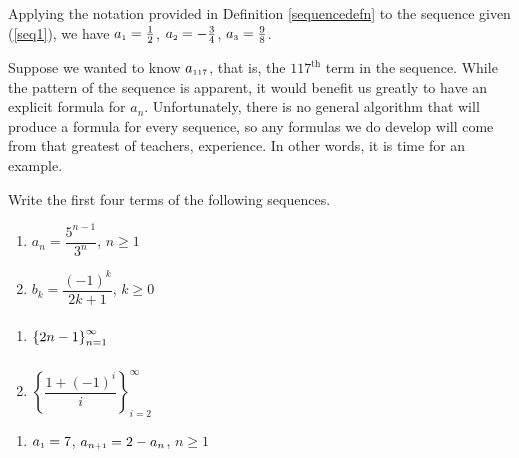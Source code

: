 \smallskip

Applying the notation provided in Definition \ref{sequencedefn} to the sequence given (\ref{seq1}), we have $a_{\text{\tiny$1$}} =  \frac{1}{2}$, $a_{\text{\tiny$2$}} =  -\frac{3}{4}$, $a_{\text{\tiny$3$}} =  \frac{9}{8}$. 

Suppose we wanted to know $a_{\text{\tiny$117$}}$, that is, the $117^{\text{th}}$ term in the sequence. While the pattern of the sequence is apparent, it would benefit us greatly to have an explicit formula for $a_{n}$.  Unfortunately, there is no general algorithm that will produce a formula for every sequence, so any formulas we do  develop will come from that greatest of teachers, experience. In other words, it is time for an example.

\begin{ex} \label{seqex1}  Write the first four terms of the following sequences.

\begin{multicols}{2}
\begin{enumerate}


\item  $a_{n} = \dfrac{5^{n-1}}{3^{n}}$, $n \geq 1$

\item  $b_{k} = \dfrac{(-1)^{k}}{2k+1}$, $k \geq 0$

\setcounter{HW}{\value{enumi}}
\end{enumerate}
\end{multicols}

\begin{multicols}{2}
\begin{enumerate}
\setcounter{enumi}{\value{HW}}

\item  $\left\{ 2n - 1 \right\}_{n=1}^{\infty} \vphantom{\left\{\dfrac{1 + (-1)^{i}}{i} \right\}_{i=2}^{\infty}}$

\item  $\left\{\dfrac{1 + (-1)^{i}}{i} \right\}_{i=2}^{\infty}$

\setcounter{HW}{\value{enumi}}
\end{enumerate}
\end{multicols}

\begin{multicols}{2}
\begin{enumerate}
\setcounter{enumi}{\value{HW}}


\item\label{introrecursiveex01}  $a_{\text{\tiny$1$}} = 7$, $a_{n \text{\tiny$ + 1$}} = 2 - a_{n}$, $n \geq 1$


\end{enumerate}
\end{multicols}
\end{ex}
